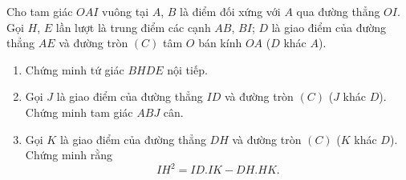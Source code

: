 \begin{ex}%
 \hfill
Cho tam giác $OAI$ vuông tại $A$, $B$ là điểm đối xứng với $A$ qua đường thẳng $OI$. Gọi $H$, $E$ lần lượt là trung điểm các cạnh $AB$, $BI$; $D$ là giao điểm của đường thẳng $AE$ và đường tròn $(C)$ tâm $O$ bán kính $OA $ ($D$ khác $A$). 
\begin{enumerate}[1)]
\item Chứng minh tứ giác $BHDE$ nội tiếp. 
\item Gọi $J$ là giao điểm của đường thẳng $ID$ và đường tròn $(C)$ ($J$ khác $D$). Chứng minh tam giác $ABJ$ cân. 
\item Gọi $K$ là giao điểm của đường thẳng $DH$ và đường tròn $(C)$ ($K$ khác $D$). Chứng minh rằng 
$$IH^2=ID. IK - DH. HK.$$
\end{enumerate}
\end{ex}
\loigiai
